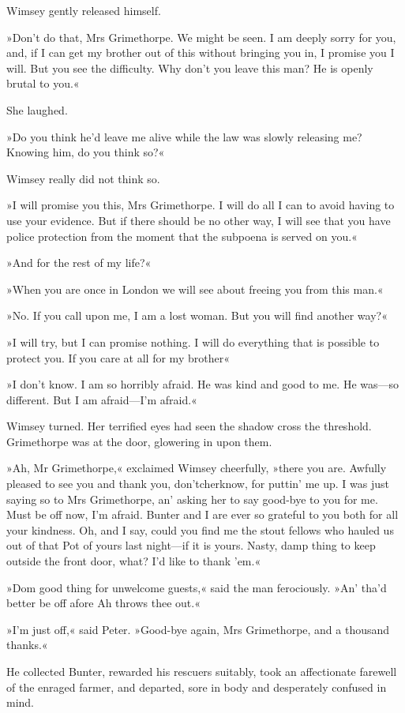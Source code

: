 Wimsey gently released himself.

»Don't do that, Mrs Grimethorpe. We might be seen. I am deeply sorry for you, and, if I can get my brother out of this without bringing you in, I promise you I will. But you see the difficulty. Why don't you leave this man? He is openly brutal to you.«

She laughed.

»Do you think he'd leave me alive while the law was slowly releasing me? Knowing him, do you think so?«

Wimsey really did not think so.

»I will promise you this, Mrs Grimethorpe. I will do all I can to avoid having to use your evidence. But if there should be no other way, I will see that you have police protection from the moment that the subpoena is served on you.«

»And for the rest of my life?«

»When you are once in London we will see about freeing you from this man.«

»No. If you call upon me, I am a lost woman. But you will find another way?«

»I will try, but I can promise nothing. I will do everything that is possible to protect you. If you care at all for my brother\longdash«

»I don't know. I am so horribly afraid. He was kind and good to me. He was—so different. But I am afraid—I'm afraid.«

Wimsey turned. Her terrified eyes had seen the shadow cross the threshold. Grimethorpe was at the door, glowering in upon them.

»Ah, Mr Grimethorpe,« exclaimed Wimsey cheerfully, »there you are.  Awfully pleased to see you and thank you, don'tcherknow, for puttin' me up. I was just saying so to Mrs Grimethorpe, an' asking her to say good-bye to you for me. Must be off now, I'm afraid. Bunter and I are ever so grateful to you both for all your kindness. Oh, and I say, could you find me the stout fellows who hauled us out of that Pot of yours last night—if it is yours. Nasty, damp thing to keep outside the front door, what? I'd like to thank 'em.«

»Dom good thing for unwelcome guests,« said the man ferociously. »An' tha'd better be off afore Ah throws thee out.«

»I'm just off,« said Peter. »Good-bye again, Mrs Grimethorpe, and a thousand thanks.«

He collected Bunter, rewarded his rescuers suitably, took an affectionate farewell of the enraged farmer, and departed, sore in body and desperately confused in mind. 
